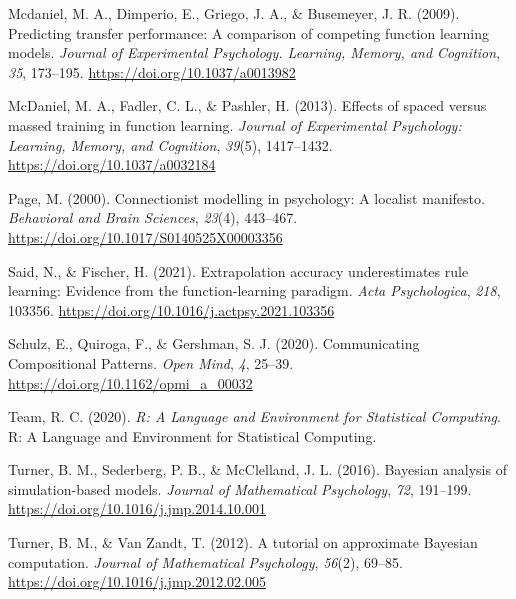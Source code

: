 \documentclass[
  letterpaper,
  DIV=11,
  numbers=noendperiod,
  oneside]{scrartcl}
\newlength{\cslhangindent}
\newenvironment{CSLReferences}[2] %
 {\begin{list}{}{%
  \setlength{\itemindent}{0pt}
  \setlength{\leftmargin}{0pt}
  \setlength{\parsep}{0pt}
  \ifodd #1
   \setlength{\leftmargin}{\cslhangindent}
   \setlength{\itemindent}{-1\cslhangindent}
  \fi
  \setlength{\itemsep}{#2\baselineskip}}}
 {\end{list}}
\begin{document}
\begin{CSLReferences}{1}{0}
Mcdaniel, M. A., Dimperio, E., Griego, J. A., \& Busemeyer, J. R.
(2009). Predicting transfer performance: {A} comparison of competing
function learning models. \emph{Journal of Experimental Psychology.
Learning, Memory, and Cognition}, \emph{35}, 173--195.
\url{https://doi.org/10.1037/a0013982}

McDaniel, M. A., Fadler, C. L., \& Pashler, H. (2013). Effects of spaced
versus massed training in function learning. \emph{Journal of
Experimental Psychology: Learning, Memory, and Cognition}, \emph{39}(5),
1417--1432. \url{https://doi.org/10.1037/a0032184}

Page, M. (2000). Connectionist modelling in psychology: {A} localist
manifesto. \emph{Behavioral and Brain Sciences}, \emph{23}(4), 443--467.
\url{https://doi.org/10.1017/S0140525X00003356}

Said, N., \& Fischer, H. (2021). Extrapolation accuracy underestimates
rule learning: {Evidence} from the function-learning paradigm.
\emph{Acta Psychologica}, \emph{218}, 103356.
\url{https://doi.org/10.1016/j.actpsy.2021.103356}

Schulz, E., Quiroga, F., \& Gershman, S. J. (2020). Communicating
{Compositional Patterns}. \emph{Open Mind}, \emph{4}, 25--39.
\url{https://doi.org/10.1162/opmi_a_00032}

Team, R. C. (2020). \emph{R: {A Language} and {Environment} for
{Statistical Computing}}. R: A Language and Environment for Statistical
Computing.

Turner, B. M., Sederberg, P. B., \& McClelland, J. L. (2016). Bayesian
analysis of simulation-based models. \emph{Journal of Mathematical
Psychology}, \emph{72}, 191--199.
\url{https://doi.org/10.1016/j.jmp.2014.10.001}

Turner, B. M., \& Van Zandt, T. (2012). A tutorial on approximate
{Bayesian} computation. \emph{Journal of Mathematical Psychology},
\emph{56}(2), 69--85. \url{https://doi.org/10.1016/j.jmp.2012.02.005}

\end{CSLReferences}
\end{document}
